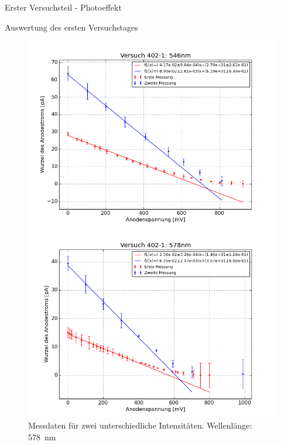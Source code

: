 \documentclass[pdftex, a4paper,11pt, twoside, ngerman]{report}
\begin{document}
\begin{chapter}{Erster Versuchsteil - Photoeffekt}
\begin{section}{Auswertung des ersten Versuchstages}
\begin{figure}[htbp]
\begin{minipage}{0.48\textwidth}
        \end{minipage}
        \begin{minipage}{0.48\textwidth}
          \centering
          \includegraphics[width=\textwidth]{Figures/Versuch402_1_546.png}
          \caption{Messdaten für zwei unterschiedliche Intensitäten. Wellenlänge: \SI{546}{\nano\meter}}\label{fig:Versuch402_1_546}
        \end{minipage}\quad
        \begin{minipage}{0.48\textwidth}
          \centering
          \includegraphics[width=\textwidth]{Figures/Versuch402_1_578.png}
          \caption{Messdaten für zwei unterschiedliche Intensitäten. Wellenlänge: \SI{578}{\nano\meter}}\label{fig:Versuch402_1_578}
        \end{minipage}
      \end{figure}
      

\end{section}
\end{chapter}
\end{document}
